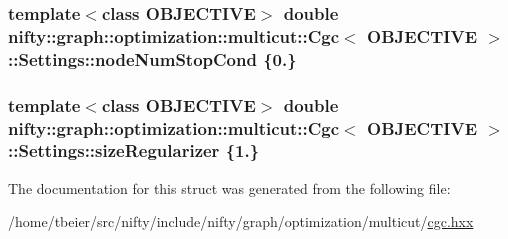 \subsubsection[{node\+Num\+Stop\+Cond}]{\setlength{\rightskip}{0pt plus 5cm}template$<$class O\+B\+J\+E\+C\+T\+I\+V\+E$>$ double {\bf nifty\+::graph\+::optimization\+::multicut\+::\+Cgc}$<$ O\+B\+J\+E\+C\+T\+I\+V\+E $>$\+::Settings\+::node\+Num\+Stop\+Cond \{0.\}}\label{structnifty_1_1graph_1_1optimization_1_1multicut_1_1Cgc_1_1Settings_a6548eeee6ce416e6d9c55304617f4a7a}
\hypertarget{structnifty_1_1graph_1_1optimization_1_1multicut_1_1Cgc_1_1Settings_afdadff9816d3e4ea88dc64b035380bc6}{}
\subsubsection[{size\+Regularizer}]{\setlength{\rightskip}{0pt plus 5cm}template$<$class O\+B\+J\+E\+C\+T\+I\+V\+E$>$ double {\bf nifty\+::graph\+::optimization\+::multicut\+::\+Cgc}$<$ O\+B\+J\+E\+C\+T\+I\+V\+E $>$\+::Settings\+::size\+Regularizer \{1.\}}\label{structnifty_1_1graph_1_1optimization_1_1multicut_1_1Cgc_1_1Settings_afdadff9816d3e4ea88dc64b035380bc6}


The documentation for this struct was generated from the following file\+:\begin{DoxyCompactItemize}
\item 
/home/tbeier/src/nifty/include/nifty/graph/optimization/multicut/\hyperlink{cgc_8hxx}{cgc.\+hxx}\end{DoxyCompactItemize}
